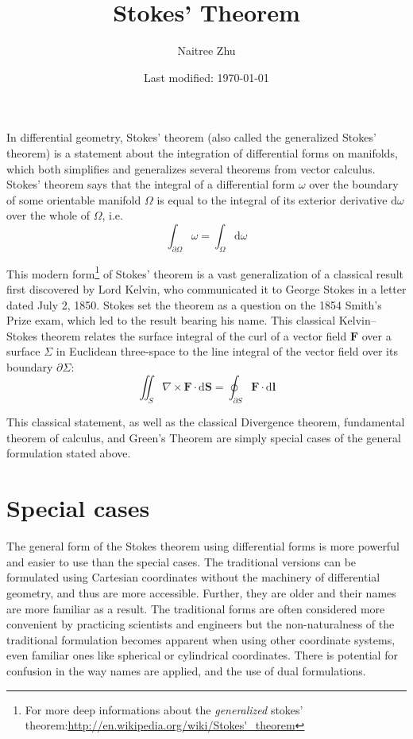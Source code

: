 \documentclass[a4paper]{article}
\title{Stokes' Theorem}
\author{Naitree Zhu}
\date{Last modified: \today}
\begin{document}
\maketitle
In differential geometry, Stokes' theorem (also called the generalized Stokes' theorem) is a statement about the integration of differential forms on manifolds, which both simplifies and generalizes several theorems from vector calculus. 
 Stokes' theorem says that the integral of a differential form $\omega$ over the boundary of some orientable manifold $\Omega$ is equal to the integral of its exterior derivative $\mathrm{d}\omega$ over the whole of $\Omega$, i.e.
\begin{equation}
\int_{\partial\Omega} \omega=\int_\Omega \mathrm{d}\omega
\end{equation}

This modern form\footnote{For more deep informations about the \emph{generalized} stokes' theorem:\url{http://en.wikipedia.org/wiki/Stokes'_theorem}} of Stokes' theorem is a vast generalization of a classical result first discovered by Lord Kelvin, who communicated it to George Stokes in a letter dated July 2, 1850. Stokes set the theorem as a question on the 1854 Smith's Prize exam, which led to the result bearing his name. 
This classical Kelvin--Stokes theorem relates the surface integral of the curl of a vector field $\boldsymbol{F}$ over a surface $\Sigma$ in Euclidean three-space to the line integral of the vector field over its boundary $\partial\Sigma$:
\begin{equation}
\iint_S \nabla\times \boldsymbol{F}\cdot \mathrm{d}\boldsymbol{S}=\oint_{\partial S}\boldsymbol{F}\cdot\mathrm{d}\boldsymbol{l}
\end{equation}

This classical statement, as well as the classical Divergence theorem, fundamental theorem of calculus, and Green's Theorem are simply special cases of the general formulation stated above.
\part{Special cases}
The general form of the Stokes theorem using differential forms is more powerful and easier to use than the special cases. The traditional versions can be formulated using Cartesian coordinates without the machinery of differential geometry, and thus are more accessible. Further, they are older and their names are more familiar as a result.
 The traditional forms are often considered more convenient by practicing scientists and engineers but the non-naturalness of the traditional formulation becomes apparent when using other coordinate systems, even familiar ones like spherical or cylindrical coordinates. There is potential for confusion in the way names are applied, and the use of dual formulations.
\end{document}
